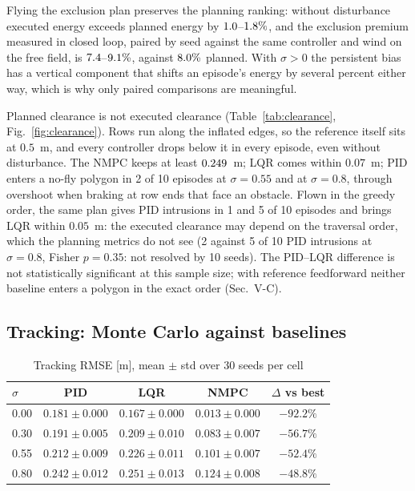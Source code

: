\documentclass[\PAPERCLASSOPT]{IEEEtran}
\begin{document}
\begin{table}[t]
\caption{Closed loop on the exclusion plan (exact order): RMSE [m], minimum distance from the
executed track to the raw no-fly polygons [m] over 10 seeds, episodes below the
planned $0.5$~m clearance and episodes entering a no-fly polygon}
\label{tab:clearance}
\centering
\footnotesize
\setlength{\tabcolsep}{3.3pt}

\end{table}

Flying the exclusion plan preserves the planning ranking: without
disturbance executed energy exceeds planned energy by
$1.0$--$1.8\%$, and the exclusion premium measured in
closed loop, paired by seed against the same controller and wind on the free
field, is $7.4$--$9.1\%$, against $8.0\%$ planned. With
$\sigma>0$ the persistent bias has a vertical component that shifts an
episode's energy by several percent either way, which is why only paired
comparisons are meaningful.

Planned clearance is not executed clearance (Table~\ref{tab:clearance},
Fig.~\ref{fig:clearance}). Rows
run along the inflated edges, so the reference itself sits at $0.5$~m, and every
controller drops below it in every episode, even without disturbance. The
NMPC keeps at least $0.249$~m;
LQR comes within $0.07$~m; PID enters a no-fly polygon in 2 of 10 episodes at
$\sigma=0.55$ and at $\sigma=0.8$, through overshoot when braking at row ends
that face an obstacle. Flown in the greedy order, the same plan gives PID
intrusions in 1 and 5 of 10 episodes and brings LQR within $0.05$~m: the executed
clearance may depend on the traversal order, which the planning metrics do not
see (2 against 5 of 10 PID intrusions at $\sigma=0.8$, Fisher $p=0.35$: not
resolved by 10 seeds). The PID--LQR difference is not statistically significant at this
sample size; with reference feedforward neither baseline enters a polygon in
the exact order (Sec.~V-C).

\subsection{Tracking: Monte Carlo against baselines}

\begin{table}[t]
\caption{Tracking RMSE [m], mean $\pm$ std over 30 seeds per cell}
\label{tab:mc}
\centering
\footnotesize
\setlength{\tabcolsep}{3pt}
\begin{tabular}{lcccc}
\toprule
$\sigma$ & \textbf{PID} & \textbf{LQR} & \textbf{NMPC} & \textbf{$\Delta$ vs best} \\
\midrule
0.00 & $0.181\pm0.000$ & $0.167\pm0.000$ & $\mathbf{0.013\pm0.000}$ & $-92.2\%$ \\
0.30 & $0.191\pm0.005$ & $0.209\pm0.010$ & $\mathbf{0.083\pm0.007}$ & $-56.7\%$ \\
0.55 & $0.212\pm0.009$ & $0.226\pm0.011$ & $\mathbf{0.101\pm0.007}$ & $-52.4\%$ \\
0.80 & $0.242\pm0.012$ & $0.251\pm0.013$ & $\mathbf{0.124\pm0.008}$ & $-48.8\%$ \\
\bottomrule
\end{tabular}
\end{table}
\end{document}

